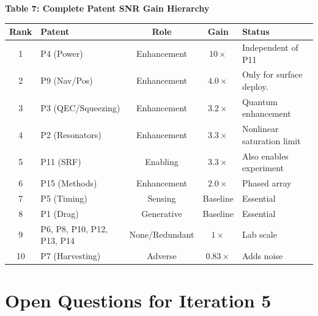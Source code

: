 \begin{center}
\textbf{Table 7: Complete Patent SNR Gain Hierarchy}
\vspace{0.5em}

\begin{tabular}{@{}clccl@{}}
\toprule
\textbf{Rank} & \textbf{Patent} & \textbf{Role} & \textbf{Gain} & \textbf{Status} \\
\midrule
1 & P4 (Power) & Enhancement & $10\times$ & Independent of P11 \\
2 & P9 (Nav/Pos) & Enhancement & $4.0\times$ & Only for surface deploy. \\
3 & P3 (QEC/Squeezing) & Enhancement & $3.2\times$ & Quantum enhancement \\
4 & P2 (Resonators) & Enhancement & $3.3\times$ & Nonlinear saturation limit \\
5 & P11 (SRF) & Enabling & $3.3\times$ & Also enables experiment \\
6 & P15 (Methods) & Enhancement & $2.0\times$ & Phased array \\
7 & P5 (Timing) & Sensing & Baseline & Essential \\
8 & P1 (Drag) & Generative & Baseline & Essential \\
9 & P6, P8, P10, P12, P13, P14 & None/Redundant & $1\times$ & Lab scale \\
10 & P7 (Harvesting) & Adverse & $0.83\times$ & Adds noise \\
\bottomrule
\end{tabular}
\end{center}

\section{Open Questions for Iteration 5}
\label{sec:open}

